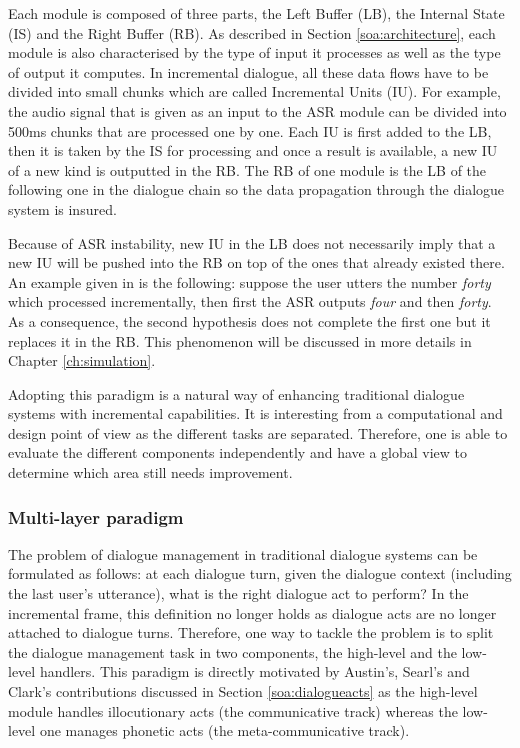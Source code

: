 Each module is composed of three parts, the Left Buffer (LB), the Internal State (IS) and the Right Buffer (RB). As described in Section \ref{soa:architecture}, each module is also characterised by the type of input it processes as well as the type of output it computes. In incremental dialogue, all these data flows have to be divided into small chunks which are called Incremental Units (IU). For example, the audio signal that is given as an input to the ASR module can be divided into 500ms chunks that are processed one by one. Each IU is first added to the LB, then it is taken by the IS for processing and once a result is available, a new IU of a new kind is outputted in the RB. The RB of one module is the LB of the following one in the dialogue chain so the data propagation through the dialogue system is insured.

Because of ASR instability, new IU in the LB does not necessarily imply that a new IU will be pushed into the RB on top of the ones that already existed there. An example given in \cite{Schlangen2011} is the following: suppose the user utters the number \textit{forty} which processed incrementally, then first the ASR outputs \textit{four} and then \textit{forty}. As a consequence, the second hypothesis does not complete the first one but it replaces it in the RB. This phenomenon will be discussed in more details in Chapter \ref{ch:simulation}.

Adopting this paradigm is a natural way of enhancing traditional dialogue systems with incremental capabilities. It is interesting from a computational and design point of view as the different tasks are separated. Therefore, one is able to evaluate the different components independently \cite{Baumann2011} and have a global view to determine which area still needs improvement.

\subsubsection{Multi-layer paradigm}

The problem of dialogue management in traditional dialogue systems can be formulated as follows: at each dialogue turn, given the dialogue context (including the last user's utterance), what is the right dialogue act to perform? In the incremental frame, this definition no longer holds as dialogue acts are no longer attached to dialogue turns. Therefore, one way to tackle the problem is to split the dialogue management task in two components, the high-level and the low-level handlers. This paradigm is directly motivated by Austin's, Searl's and Clark's contributions discussed in Section \ref{soa:dialogueacts} as the high-level module handles illocutionary acts (the communicative track) whereas the low-level one manages phonetic acts (the meta-communicative track).

